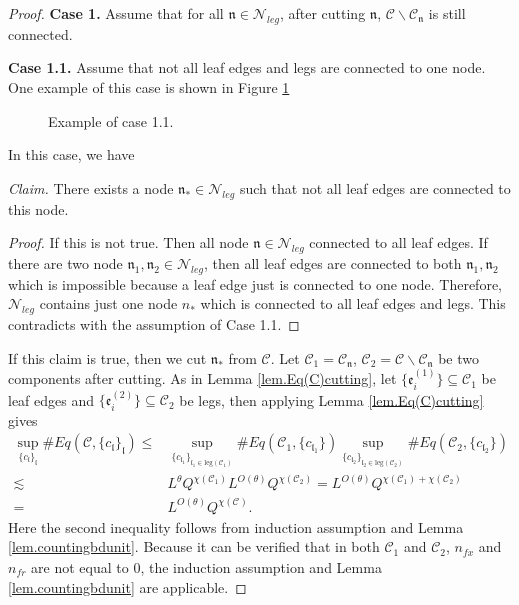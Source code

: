 \begin{proof}
\textbf{Case 1.} Assume that for all $\mathfrak{n}\in \mathcal{N}_{leg}$, after cutting $\mathfrak{n}$, $\mathcal{C}\backslash \mathcal{C}_{\mathfrak{n}}$ is still connected.

\textbf{Case 1.1.} Assume that not all leaf edges and legs are connected to one node. One example of this case is shown in Figure \ref{fig.examplecase1.1}
\begin{figure}[H]
        \caption{Example of case 1.1.}
        \centering
        \label{fig.examplecase1.1}
    \end{figure}

In this case, we have

\textit{Claim.} There exists a node $\mathfrak{n}_*\in \mathcal{N}_{leg}$ such that not all leaf edges are connected to this node.
\begin{proof}
If this is not true. Then all node $\mathfrak{n}\in \mathcal{N}_{leg}$ connected to all leaf edges. If there are two node $\mathfrak{n}_1, \mathfrak{n}_2\in \mathcal{N}_{leg}$, then all leaf edges are connected to both $\mathfrak{n}_1, \mathfrak{n}_2$ which is impossible because a leaf edge just is connected to one node. Therefore, $\mathcal{N}_{leg}$ contains just one node $n_*$ which is connected to all leaf edges and legs. This contradicts with the assumption of Case 1.1.
\end{proof}

If this claim is true, then we cut $\mathfrak{n}_*$ from $\mathcal{C}$. Let $\mathcal{C}_1=\mathcal{C}_{\mathfrak{n}}$, $\mathcal{C}_2=\mathcal{C}\backslash \mathcal{C}_{\mathfrak{n}}$ be two components after cutting. As in Lemma \ref{lem.Eq(C)cutting}, let  $\{\mathfrak{e}_{i}^{(1)}\}\subseteq \mathcal{C}_1$ be leaf edges and $\{\mathfrak{e}_{i}^{(2)}\}\subseteq \mathcal{C}_2$ be legs, then applying Lemma \ref{lem.Eq(C)cutting} gives
\begin{equation}
\begin{split}
    \sup_{\{c_{\mathfrak{l}}\}_{\mathfrak{l}}}\#Eq(\mathcal{C},\{c_{\mathfrak{l}}\}_{\mathfrak{l}})\le&
    \sup_{\{c_{\mathfrak{l}_1}\}_{\mathfrak{l}_1\in \text{leg}(\mathcal{C}_1)} } \# Eq(\mathcal{C}_1,\{c_{\mathfrak{l}_1}\}) \sup_{\{c_{\mathfrak{l}_2}\}_{\mathfrak{l}_2\in \text{leg}(\mathcal{C}_2)} }\# Eq(\mathcal{C}_{2}, \{c_{\mathfrak{l}_2}\})
    \\
    \lesssim&  L^{\theta} Q^{\chi(\mathcal{C}_1)} L^{O(\theta)} Q^{\chi(\mathcal{C}_2)} = L^{O(\theta)} Q^{\chi(\mathcal{C}_1)+\chi(\mathcal{C}_2)} \\
    =& L^{O(\theta)} Q^{\chi(\mathcal{C})}.
\end{split}
\end{equation}
Here the second inequality follows from induction assumption and Lemma \ref{lem.countingbdunit}. Because it can be verified that in both $\mathcal{C}_1$ and $\mathcal{C}_2$, $n_{\textit{fx}}$ and $n_{\textit{fr}}$ are not equal to $0$, the induction assumption and Lemma \ref{lem.countingbdunit} are applicable.


\end{proof}
